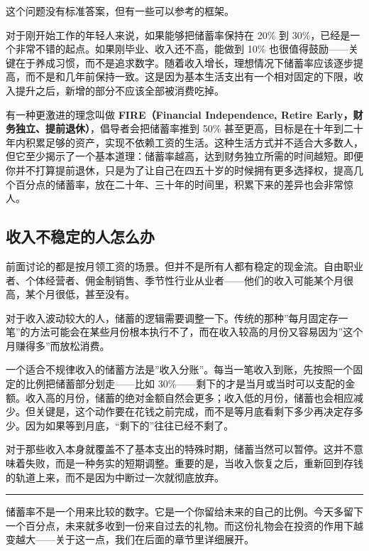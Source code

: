 \documentclass[a4paper,11pt,oneside,fontset=none,UTF8,zihao=-4]{ctexbook}
\begin{document}
这个问题没有标准答案，但有一些可以参考的框架。

对于刚开始工作的年轻人来说，如果能够把储蓄率保持在 20\% 到
30\%，已经是一个非常不错的起点。如果刚毕业、收入还不高，能做到 10\%
也很值得鼓励------关键在于养成习惯，而不是追求数字。随着收入增长，理想情况下储蓄率应该逐步提高，而不是和几年前保持一致。这是因为基本生活支出有一个相对固定的下限，收入提升之后，新增的部分不应该全部被消费吃掉。

有一种更激进的理念叫做 \textbf{FIRE（Financial Independence, Retire
Early，财务独立、提前退休）}，倡导者会把储蓄率推到 50\%
甚至更高，目标是在十年到二十年内积累足够的资产，实现不依赖工资的生活。这种生活方式并不适合大多数人，但它至少揭示了一个基本道理：储蓄率越高，达到财务独立所需的时间越短。即便你并不打算提前退休，只是为了让自己在四五十岁的时候拥有更多选择权，提高几个百分点的储蓄率，放在二十年、三十年的时间里，积累下来的差异也会非常惊人。

\subsection{收入不稳定的人怎么办}\label{ux6536ux5165ux4e0dux7a33ux5b9aux7684ux4ebaux600eux4e48ux529e}

前面讨论的都是按月领工资的场景。但并不是所有人都有稳定的现金流。自由职业者、个体经营者、佣金制销售、季节性行业从业者------他们的收入可能某个月很高，某个月很低，甚至没有。

对于收入波动较大的人，储蓄的逻辑需要调整一下。传统的那种''每月固定存一笔''的方法可能会在某些月份根本执行不了，而在收入较高的月份又容易因为''这个月赚得多''而放松消费。

一个适合不规律收入的储蓄方法是''收入分账''。每当一笔收入到账，先按照一个固定的比例把储蓄部分划走------比如
30\%------剩下的才是当月或当时可以支配的金额。收入高的月份，储蓄的绝对金额自然会更多；收入低的月份，储蓄也会相应减少。但关键是，这个动作要在花钱之前完成，而不是等月底看剩下多少再决定存多少。因为如果等到月底，``剩下的''往往已经不剩了。

对于那些收入本身就覆盖不了基本支出的特殊时期，储蓄当然可以暂停。这并不意味着失败，而是一种务实的短期调整。重要的是，当收入恢复之后，重新回到存钱的轨道上来，而不是因为中断过一次就彻底放弃。

\begin{center}{\color{dh-bronze}\rule{0.2\textwidth}{0.5pt}}\end{center}

储蓄率不是一个用来比较的数字。它是一个你留给未来的自己的比例。今天多留下一个百分点，未来就多收到一份来自过去的礼物。而这份礼物会在投资的作用下越变越大------关于这一点，我们在后面的章节里详细展开。
\end{document}
